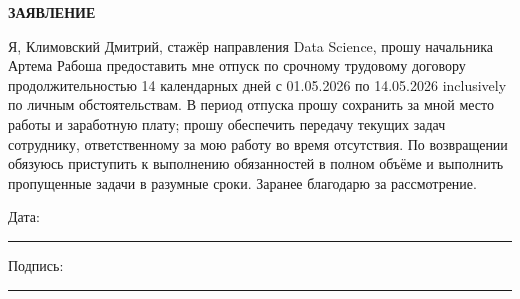\documentclass[12pt]{article}
\begin{document}
\begin{center}
\textbf{\LARGE ЗАЯВЛЕНИЕ}
\end{center}

\vspace{1cm}



Я, Климовский Дмитрий, стажёр направления Data Science, прошу начальника Артема Рабоша предоставить мне отпуск по срочному трудовому договору продолжительностью 14 календарных дней с 01.05.2026 по 14.05.2026 inclusively по личным обстоятельствам. В период отпуска прошу сохранить за мной место работы и заработную плату; прошу обеспечить передачу текущих задач сотруднику, ответственному за мою работу во время отсутствия. По возвращении обязуюсь приступить к выполнению обязанностей в полном объёме и выполнить пропущенные задачи в разумные сроки. Заранее благодарю за рассмотрение.

\vfill

\noindent
Дата: \rule{5cm}{0.4pt} \hfill Подпись: \rule{5cm}{0.4pt}
\end{document}
